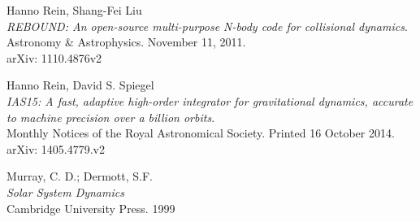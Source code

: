 \newpage
\begin{thebibliography}{9}

Hanno Rein, Shang-Fei Liu\\
\textit{REBOUND: An open-source multi-purpose N-body code for collisional dynamics}.\\
Astronomy \& Astrophysics.  November 11, 2011.\\
arXiv: 1110.4876v2

Hanno Rein, David S. Spiegel\\
\textit{IAS15: A fast, adaptive high-order integrator for gravitational dynamics, accurate to machine precision over a billion orbits}.\\
Monthly Notices of the Royal Astronomical Society.  Printed 16 October 2014.\\
arXiv: 1405.4779.v2

Murray, C. D.; Dermott, S.F. \\
\textit{Solar System Dynamics}\\
Cambridge University Press. 1999

\end{thebibliography}